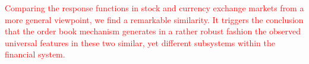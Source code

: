 \textcolor{red}{
Comparing the response functions in stock and currency exchange markets from a
more general viewpoint, we find a remarkable similarity. It triggers the
conclusion that the order book mechanism generates in a rather robust fashion
the observed universal features in these two similar, yet different subsystems
within the financial system.}